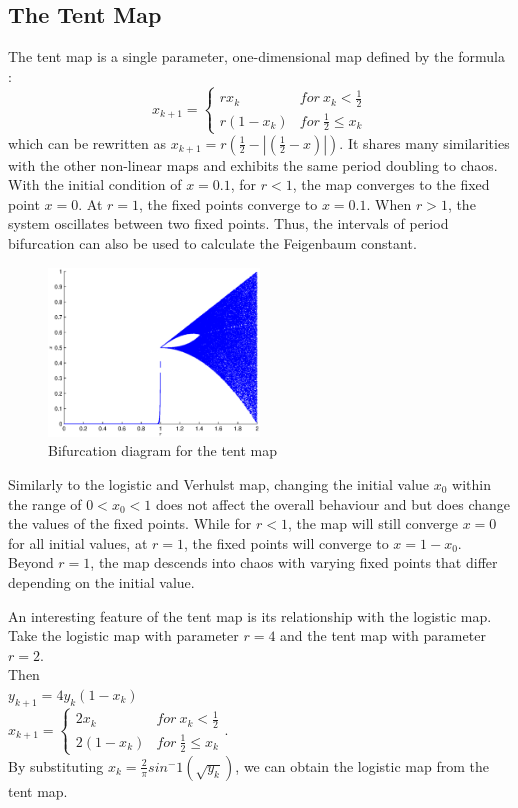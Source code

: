 \documentclass[a4paper]{article}
\begin{document}
\subsection{The Tent Map}
The tent map is a single parameter, one-dimensional map defined by the formula :
{ \[ x_{k+1} = \begin{cases}
rx_k      & for\  x_k<\frac{1}{2} \\ 
r(1-x_k)  & for\  \frac{1}{2}\leq x_k\end{cases} \]}
which can be rewritten as $x_{k+1}=r(\frac{1}{2}-\left|(\frac{1}{2}-x)\right|)$. 
It shares many similarities with the other non-linear maps and exhibits the same period doubling to chaos. With the initial condition of $ x=0.1 $, for $ r<1 $, the map converges to the fixed point $ x=0 $. At $ r=1 $, the fixed points converge to $ x=0.1 $. When $ r>1 $, the system oscillates between two fixed points. Thus, the intervals of period bifurcation can also be used to calculate the Feigenbaum constant. 

\begin{figure} %
    \centering
    \includegraphics[width=0.5\textwidth]{tentbifur}
    \caption{Bifurcation diagram for the tent map}
\end{figure}

Similarly to the logistic and Verhulst map, changing the initial value $ x_0 $ within the range of $ 0 < x_0 < 1$ does not affect the overall behaviour and but does change the values of the fixed points. While for $ r<1 $, the map will still converge $ x=0 $ for all initial values, at $ r=1 $, the fixed points will converge to $ x=1-x_0 $. Beyond $ r=1 $, the map descends into chaos with varying fixed points that differ depending on the initial value.

An interesting feature of the tent map is its relationship with the logistic map. Take the logistic map with parameter $ r=4 $ and the tent map with parameter $ r=2 $. 
\\Then  
\\$y_{k+1} = 4y_k(1-x_k)$ 
\\{$x_{k+1} = \begin{cases}
2x_k      & for\  x_k<\frac{1}{2} \\ 
2(1-x_k)  & for\  \frac{1}{2}\leq x_k\end{cases}$}. 
\\By substituting $ x_k=\frac{2}{\pi}sin^-1(\sqrt{y_k})$, we can obtain the logistic map from the tent map.
\end{document}
